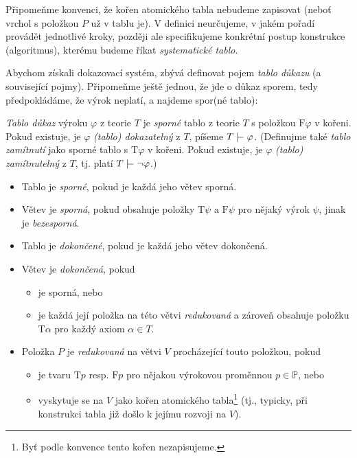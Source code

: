 Připomeňme konvenci, že kořen atomického tabla nebudeme zapisovat (neboť vrchol s položkou $P$ už v tablu je). V definici neurčujeme, v jakém pořadí provádět jednotlivé kroky, později ale specifikujeme konkrétní postup konstrukce (algoritmus), kterému budeme říkat \emph{systematické tablo}. 

Abychom získali dokazovací systém, zbývá definovat pojem \emph{tablo důkazu} (a související pojmy). Připomeňme ještě jednou, že jde o důkaz sporem, tedy předpokládáme, že výrok neplatí, a najdeme spor(né tablo):

\begin{definition}
\emph{Tablo důkaz} výroku $\varphi$ z teorie $T$ je \emph{sporné} tablo z teorie $T$ s položkou $\mathrm{F}\varphi$ v kořeni. Pokud existuje, je $\varphi$ \emph{(tablo) dokazatelný} z $T$, píšeme $T\proves\varphi$. (Definujme také \emph{tablo zamítnutí} jako sporné tablo s $\mathrm{T}\varphi$ v kořeni. Pokud existuje, je $\varphi$ \emph{(tablo) zamítnutelný} z $T$, tj. platí $T\proves\neg\varphi$.)  
\begin{itemize}
    \item Tablo je \emph{sporné}, pokud je každá jeho větev sporná.
    \item Větev je \emph{sporná}, pokud obsahuje položky $\mathrm{T}\psi$ a $\mathrm{F}\psi$ pro nějaký výrok $\psi$, jinak je \emph{bezesporná}.
    \item Tablo je \emph{dokončené}, pokud je každá jeho větev dokončená.
    \item Větev je \emph{dokončená}, pokud 
    \begin{itemize}
        \item je sporná, nebo
        \item je každá její položka na této větvi \emph{redukovaná} a zároveň obsahuje položku $\mathrm{T}\alpha$ pro každý axiom $\alpha\in T$.
    \end{itemize}
     
    \item Položka $P$ je \emph{redukovaná} na větvi $V$ procházející touto položkou, pokud 
    \begin{itemize}
        \item je tvaru $\mathrm{T}p$ resp. $\mathrm{F}p$ pro nějakou výrokovou proměnnou $p\in\mathbb P$, nebo
        \item vyskytuje se na $V$ jako kořen atomického tabla\footnote{Byť podle konvence tento kořen nezapisujeme.} (tj., typicky, při konstrukci tabla již došlo k jejímu rozvoji na $V$).
    \end{itemize}
\end{itemize}
\end{definition}

